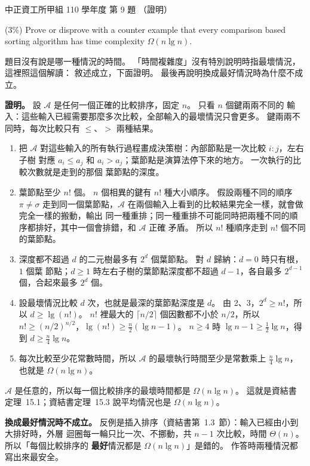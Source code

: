\begin{pastexam}[label={px:ccu-110-swa-07}]{中正資工所甲組 110 學年度 第 9 題}
（證明）

(3\%) Prove or disprove with a counter example that every comparison based sorting algorithm has
time complexity $\Omega(n\lg n)$.
\end{pastexam}

\begin{pastsoln}
題目沒有說是哪一種情況的時間。 「時間複雜度」沒有特別說明時指最壞情況，這裡照這個解讀：
敘述成立，下面證明。 最後再說明換成最好情況時為什麼不成立。

\textbf{證明。} 設 $\mathcal{A}$ 是任何一個正確的比較排序，固定 $n$。 只看 $n$ 個鍵兩兩不同的
輸入：這些輸入已經需要那麼多次比較，全部輸入的最壞情況只會更多。 鍵兩兩不同時，每次比較只有
$\le$、$>$ 兩種結果。
\begin{enumerate}
\item 把 $\mathcal{A}$ 對這些輸入的所有執行過程畫成決策樹：內部節點是一次比較 $i{:}j$，左右子樹
對應 $a_i \le a_j$ 和 $a_i > a_j$；葉節點是演算法停下來的地方。 一次執行的比較次數就是走到的那個
葉節點的深度。
\item 葉節點至少 $n!$ 個。 $n$ 個相異的鍵有 $n!$ 種大小順序。 假設兩種不同的順序 $\pi \ne \sigma$
走到同一個葉節點，$\mathcal{A}$ 在兩個輸入上看到的比較結果完全一樣，就會做完全一樣的搬動，輸出
同一種重排；同一種重排不可能同時把兩種不同的順序都排好，其中一個會排錯，和 $\mathcal{A}$ 正確
矛盾。 所以 $n!$ 種順序走到 $n!$ 個不同的葉節點。
\item 深度都不超過 $d$ 的二元樹最多有 $2^d$ 個葉節點。 對 $d$ 歸納：$d = 0$ 時只有根，$1$ 個葉
節點；$d \ge 1$ 時左右子樹的葉節點深度都不超過 $d - 1$，各自最多 $2^{d-1}$ 個，合起來最多
$2^d$ 個。
\item 設最壞情況比較 $d$ 次，也就是最深的葉節點深度是 $d$。 由 2、3，$2^d \ge n!$，所以
$d \ge \lg(n!)$。 $n!$ 裡最大的 $\lceil n/2 \rceil$ 個因數都不小於 $n/2$，所以
$n! \ge (n/2)^{n/2}$，$\lg(n!) \ge \frac{n}{2}(\lg n - 1)$。 $n \ge 4$ 時
$\lg n - 1 \ge \frac{1}{2}\lg n$，得到 $d \ge \frac{n}{4}\lg n$。
\item 每次比較至少花常數時間，所以 $\mathcal{A}$ 的最壞執行時間至少是常數乘上 $\frac{n}{4}\lg n$，
也就是 $\Omega(n \lg n)$。
\end{enumerate}
$\mathcal{A}$ 是任意的，所以每一個比較排序的最壞時間都是 $\Omega(n \lg n)$。 這就是資結書
定理~15.1；資結書定理~15.3 說平均情況也是 $\Omega(n \lg n)$。

\textbf{換成最好情況時不成立。} 反例是插入排序（資結書第~1.3~節）：輸入已經由小到大排好時，外層
迴圈每一輪只比一次、不挪動，共 $n - 1$ 次比較，時間 $\Theta(n)$。 所以「每個比較排序的
\textbf{最好}情況都是 $\Omega(n \lg n)$」是錯的。 作答時兩種情況都寫出來最安全。
\end{pastsoln}
